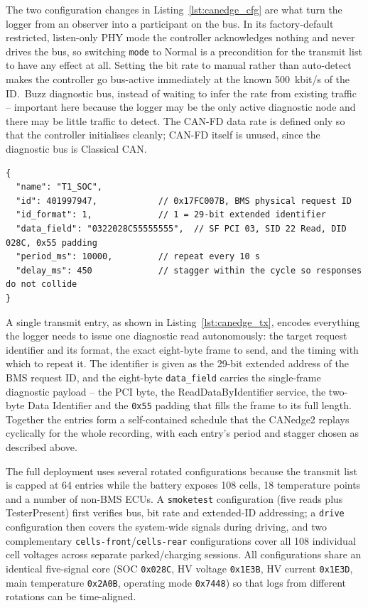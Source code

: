 \documentclass[11pt,a4paper,oneside,parskip=half]{scrreprt}
\providecommand{\hex}{}\renewcommand{\hex}[1]{\texttt{0x#1}}
\begin{document}
The two configuration changes in Listing~\ref{lst:canedge_cfg} are what turn the logger from an observer into a participant on the bus. In its factory-default restricted, listen-only PHY mode the controller acknowledges nothing and never drives the bus, so switching \texttt{mode} to Normal is a precondition for the transmit list to have any effect at all. Setting the bit rate to manual rather than auto-detect makes the controller go bus-active immediately at the known 500~kbit/s of the ID.~Buzz diagnostic bus, instead of waiting to infer the rate from existing traffic -- important here because the logger may be the only active diagnostic node and there may be little traffic to detect. The CAN-FD data rate is defined only so that the controller initialises cleanly; CAN-FD itself is unused, since the diagnostic bus is Classical CAN.

\begin{lstlisting}[caption={Structure of a single transmit-list entry: the SOC read (\hex{22 02 8C}) to the BMS at request ID \hex{17FC007B}, repeated every 10\,s.},label={lst:canedge_tx}]
{
  "name": "T1_SOC",
  "id": 401997947,            // 0x17FC007B, BMS physical request ID
  "id_format": 1,             // 1 = 29-bit extended identifier
  "data_field": "0322028C55555555",  // SF PCI 03, SID 22 Read, DID 028C, 0x55 padding
  "period_ms": 10000,         // repeat every 10 s
  "delay_ms": 450             // stagger within the cycle so responses do not collide
}
\end{lstlisting}

A single transmit entry, as shown in Listing~\ref{lst:canedge_tx}, encodes everything the logger needs to issue one diagnostic read autonomously: the target request identifier and its format, the exact eight-byte frame to send, and the timing with which to repeat it. The identifier is given as the 29-bit extended address of the BMS request ID, and the eight-byte \texttt{data\_field} carries the single-frame diagnostic payload -- the PCI byte, the ReadDataByIdentifier service, the two-byte Data Identifier and the \hex{55} padding that fills the frame to its full length. Together the entries form a self-contained schedule that the CANedge2 replays cyclically for the whole recording, with each entry's period and stagger chosen as described above.

The full deployment uses several rotated configurations because the transmit list is capped at 64 entries while the battery exposes 108 cells, 18 temperature points and a number of non-BMS ECUs. A \texttt{smoketest} configuration (five reads plus TesterPresent) first verifies bus, bit rate and extended-ID addressing; a \texttt{drive} configuration then covers the system-wide signals during driving, and two complementary \texttt{cells-front}/\texttt{cells-rear} configurations cover all 108 individual cell voltages across separate parked/charging sessions. All configurations share an identical five-signal core (SOC \hex{028C}, HV voltage \hex{1E3B}, HV current \hex{1E3D}, main temperature \hex{2A0B}, operating mode \hex{7448}) so that logs from different rotations can be time-aligned.
\end{document}
